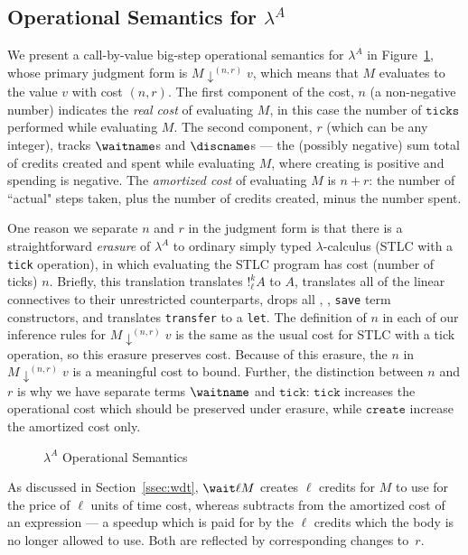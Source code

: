 \subsection{Operational Semantics for \texorpdfstring{$\lambda^A$}{the
intermediate language}} \label{ssec:la-sem}

We present a call-by-value big-step operational semantics for
$\lambda^A$ in Figure~\ref{fig:la-sem-rules}, whose primary judgment
form is $M \downarrow^{(n,r)} v$, which means that $M$ evaluates to the
value $v$ with cost $(n,r)$.  The first component of the cost, $n$ (a
non-negative number) indicates the \textit{real cost} of evaluating $M$,
in this case the number of $\texttt{ticks}$ performed while evaluating
$M$.  The second component, $r$ (which can be any integer), tracks
$\waitname$s and $\discname$s --- the (possibly negative) sum total of
credits created and spent while evaluating $M$, where creating is
positive and spending is negative.  The \emph{amortized cost} of
evaluating $M$ is $n + r$: the number of ``actual" steps taken, plus the
number of credits created, minus the number spent.

One reason we separate $n$ and $r$ in the judgment form is that there is
a straightforward \emph{erasure} of $\lambda^A$ to ordinary simply typed
$\lambda$-calculus (STLC with a \texttt{tick} operation), in which
evaluating the STLC program has cost (number of ticks) $n$.  Briefly,
this translation translates $!^k_\ell A$ to $A$, translates all of the
linear connectives to their unrestricted counterparts, drops all
\waitname, \discname, \texttt{save} term constructors, and translates
\texttt{transfer} to a \texttt{let}.  The definition of $n$ in each of
our inference rules for $M \downarrow^{(n,r)} v$ is the same as the
usual cost for STLC with a tick operation, so this erasure preserves
cost.  Because of this erasure, the $n$ in $M \downarrow^{(n,r)} v$ is a
meaningful cost to bound. Further, the distinction between $n$ and $r$
is why we have separate terms $\waitname$ and $\texttt{tick}$:
$\texttt{tick}$ increases the operational cost which should be preserved
under erasure, while $\texttt{create}$ increase the amortized cost only.

\begin{figure}
  \caption{$\lambda^A$ Operational Semantics}
  \label{fig:la-sem-rules}
\end{figure}

As discussed in
Section~\ref{ssec:wdt}, $\wait \ell M$ creates $\ell$ credits for $M$ to
use for the price of $\ell$ units of time cost, whereas
\discname\/ subtracts from the amortized cost of an expression ---
a speedup which is paid for by the $\ell$ credits which the body is no
longer allowed to use.  Both are reflected by corresponding changes
to~$r$.

